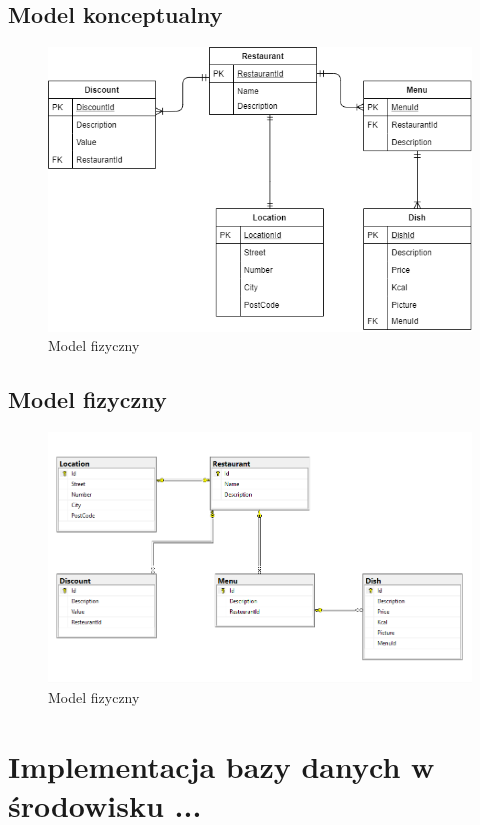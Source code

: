 \documentclass{article}
\begin{document}
	\subsection{Model konceptualny}
\begin{figure}[hbt!]
				\includegraphics[width=16cm]{Files/Pictures/Model_K}
				\centering
				\caption{Model fizyczny}
			\end{figure}
	\subsection{Model fizyczny}
\begin{figure}[hbt!]
				\includegraphics[width=16cm]{Files/Pictures/Model}
				\centering
				\caption{Model fizyczny}
			\end{figure}
\section{Implementacja bazy danych w środowisku ...}
\end{document}
